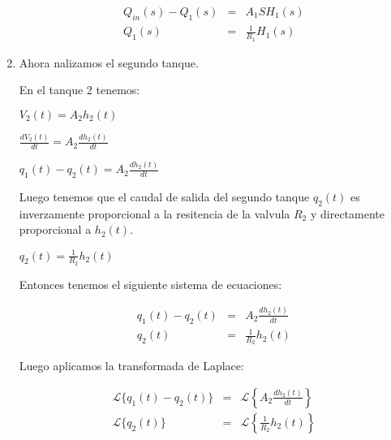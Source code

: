 \documentclass[12pt]{article}
\begin{document}
\begin{enumerate}
\setcounter{equation}{0}
    \begin{eqnarray}
      Q_{in}(s) - Q_{1}(s) &=& A_{1}SH_{1}(s) \\[2mm]
      Q_{1}(s) &=& \frac{1}{R_{1}}H_{1}(s)
    \end{eqnarray}
  \item Ahora nalizamos el segundo tanque.\\


    En el tanque 2 tenemos: 

    \(\displaystyle V_{2}(t)=A_{2}h_{2}(t)\)

    \( \displaystyle \frac{dV_{2}(t)}{dt}=A_{2}\frac{dh_{2}(t)}{dt} \)

    \( \displaystyle q_{1}(t)-q_{2}(t) = A_{2}\frac{dh_{2}(t)}{dt} \)

    Luego tenemos que el caudal de salida del segundo tanque $q_{2}(t)$ es inverzamente
    proporcional a la resitencia de la valvula $R_{2}$ y directamente proporcional a $h_{2}(t)$.

    \( \displaystyle q_{2}(t)=\frac{1}{R_{2}}h_{2}(t)\)

    Entonces tenemos el siguiente sistema de ecuaciones:

    \begin{eqnarray*}
      q_{1}(t) - q_{2}(t) &=& A_{2}\frac{dh_{2}(t)}{dt} \\
      q_{2}(t) &=& \frac{1}{R_{2}}h_{2}(t)
    \end{eqnarray*}

    Luego aplicamos la transformada de Laplace:
 
    \begin{eqnarray*}
      \mathscr{L}\{q_{1}(t) - q_{2}(t)\} &=& \mathscr{L} \left\{ A_{2}\frac{dh_{2}(t)}{dt} \right\} \\[2mm]
      \mathscr{L}\{q_{2}(t)\} &=&\mathscr{L} \left \{ \frac{1}{R_{2}}h_{2}(t) \right\}
    \end{eqnarray*}


\end{enumerate}
\end{document}
